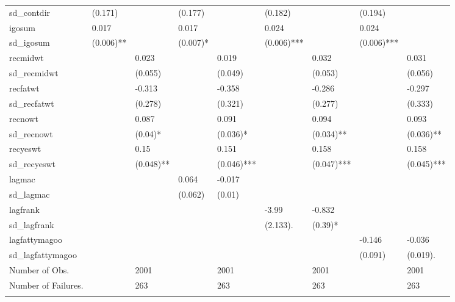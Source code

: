 \begin{table}[ht]
\begin{tabular}{lllllllll}
  sd\_contdir & (0.171)  &  & (0.177)  &  & (0.182)  &  & (0.194)  &  \\ 
  igosum & 0.017 &  & 0.017 &  & 0.024 &  & 0.024 &  \\ 
  sd\_igosum & (0.006)** &  & (0.007)* &  & (0.006)*** &  & (0.006)*** &  \\ 
  recmidwt &  & 0.023 &  & 0.019 &  & 0.032 &  & 0.031 \\ 
  sd\_recmidwt &  & (0.055)  &  & (0.049)  &  & (0.053)  &  & (0.056)  \\ 
  recfatwt &  & -0.313 &  & -0.358 &  & -0.286 &  & -0.297 \\ 
  sd\_recfatwt &  & (0.278)  &  & (0.321)  &  & (0.277)  &  & (0.333)  \\ 
  recnowt &  & 0.087 &  & 0.091 &  & 0.094 &  & 0.093 \\ 
  sd\_recnowt &  & (0.04)* &  & (0.036)* &  & (0.034)** &  & (0.036)** \\ 
  recyeswt &  & 0.15 &  & 0.151 &  & 0.158 &  & 0.158 \\ 
  sd\_recyeswt &  & (0.048)** &  & (0.046)*** &  & (0.047)*** &  & (0.045)*** \\ 
  lagmac &  &  & 0.064 & -0.017 &  &  &  &  \\ 
  sd\_lagmac &  &  & (0.062)  & (0.01)  &  &  &  &  \\ 
  lagfrank &  &  &  &  & -3.99 & -0.832 &  &  \\ 
  sd\_lagfrank &  &  &  &  & (2.133). & (0.39)* &  &  \\ 
  lagfattymagoo &  &  &  &  &  &  & -0.146 & -0.036 \\ 
  sd\_lagfattymagoo &  &  &  &  &  &  & (0.091)  & (0.019). \\ 
  Number of Obs. &  & 2001 &  & 2001 &  & 2001 &  & 2001 \\ 
  Number of Failures. &  & 263 &  & 263 &  & 263 &  & 263 \\ 
   \hline \footnotesize{  }
\end{tabular}
\end{table}
